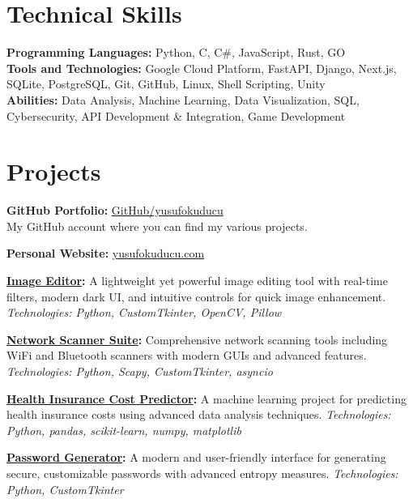 \documentclass[10pt,a4paper]{extarticle}
\begin{document}
\section{Technical Skills}
\textbf{Programming Languages:} Python, C, C\#, JavaScript, Rust, GO\\
\textbf{Tools and Technologies:} Google Cloud Platform, FastAPI, Django, Next.js, SQLite, PostgreSQL, Git, GitHub, Linux, Shell Scripting, Unity\\
\textbf{Abilities:} Data Analysis, Machine Learning, Data Visualization, SQL, Cybersecurity, API Development \& Integration, Game Development

\vspace{10pt}

\section{Projects}
\textbf{GitHub Portfolio:} \href{https://github.com/yusufokuducu}{GitHub/yusufokuducu}\\
My GitHub account where you can find my various projects.

\vspace{5pt}
\noindent\textbf{Personal Website:} \href{https://yusufokuducu.com}{yusufokuducu.com}

\vspace{5pt}
\noindent\textbf{\href{https://github.com/yusufokuducu/Image_Editor}{Image Editor}:} A lightweight yet powerful image editing tool with real-time filters, modern dark UI, and intuitive controls for quick image enhancement. \textit{Technologies: Python, CustomTkinter, OpenCV, Pillow}

\vspace{5pt}
\noindent\textbf{\href{https://github.com/yusufokuducu/Wifi-Scanner}{Network Scanner Suite}:} Comprehensive network scanning tools including WiFi and Bluetooth scanners with modern GUIs and advanced features. \textit{Technologies: Python, Scapy, CustomTkinter, asyncio}

\vspace{5pt}
\noindent\textbf{\href{https://github.com/yusufokuducu/GlobalAIHub_MCA}{Health Insurance Cost Predictor}:} A machine learning project for predicting health insurance costs using advanced data analysis techniques. \textit{Technologies: Python, pandas, scikit-learn, numpy, matplotlib}

\vspace{5pt}
\noindent\textbf{\href{https://github.com/yusufokuducu/Password_Generator}{Password Generator}:} A modern and user-friendly interface for generating secure, customizable passwords with advanced entropy measures. \textit{Technologies: Python, CustomTkinter}
\end{document}
